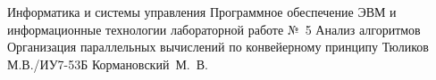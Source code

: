 	\makereporttitle
{Информатика и системы управления}
{Программное обеспечение ЭВМ и информационные технологии}
{лабораторной работе №~5}
{Анализ алгоритмов}
{Организация параллельных вычислений по конвейерному принципу}
{}
{Тюликов М.В./ИУ7-53Б}
{Кормановский~М.~В.}